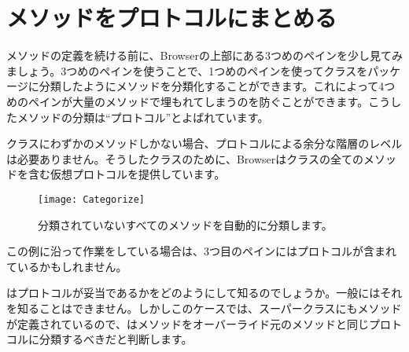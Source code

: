 \documentclass[a4paper,10pt,twoside]{book}
\begin{document}

\section{メソッドをプロトコルにまとめる}

メソッドの定義を続ける前に、Browserの上部にある3つめのペインを少し見てみましょう。3つめのペインを使うことで、1つめのペインを使ってクラスをパッケージに分類したようにメソッドを分類化することができます。これによって4つめのペインが大量のメソッドで埋もれてしまうのを防ぐことができます。こうしたメソッドの分類は``プロトコル''とよばれています。


クラスにわずかのメソッドしかない場合、プロトコルによる余分な階層のレベルは必要ありません。そうしたクラスのために、Browserはクラスの全てのメソッドを含む仮想プロトコルを提供しています。


\begin{figure}[htbp]
   \centering
   \texttt{[image: Categorize]}
   \caption{分類されていないすべてのメソッドを自動的に分類します。}
\end{figure}

この例に沿って作業をしている場合は、3つ目のペインにはプロトコルが含まれているかもしれません。


\pharo はプロトコルが妥当であるかをどのようにして知るのでしょうか。一般に\pharo はそれを知ることはできません。しかしこのケースでは、スーパークラスにもメソッドが定義されているので、\pharo はメソッドをオーバーライド元のメソッドと同じプロトコルに分類するべきだと判断します。


\end{document}
